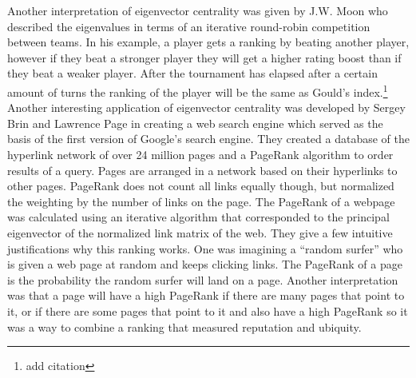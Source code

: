 \documentclass{article}
\theoremstyle{definition}
\theoremstyle{remark}
\begin{document}
Another interpretation of eigenvector centrality was given by J.W. Moon who described the eigenvalues in terms of an iterative round-robin competition between teams.  In his example, a player gets a ranking by beating another player, however if they beat a stronger player they will get a higher rating boost than if they beat a weaker player.  After the tournament has elapsed after a certain amount of turns the ranking of the player will be the same as Gould’s index.\footnote{add citation}\\

Another interesting application of eigenvector centrality was developed by Sergey Brin and Lawrence Page in creating a web search engine which served as the basis of the first version of Google’s search engine.  They created a database of the hyperlink network of over 24 million pages and a PageRank algorithm to order results of a query.  Pages are arranged in a network based on their hyperlinks to other pages.  PageRank does not count all links equally though, but normalized the weighting by the number of links on the page.  The PageRank of a webpage was calculated using an iterative algorithm that corresponded to the principal eigenvector of the normalized link matrix of the web.  They give a few intuitive justifications why this ranking works.  One was imagining a “random surfer” who is given a web page at random and keeps clicking links.  The PageRank of a page is the probability the random surfer will land on a page.  Another interpretation was that a page will have a high PageRank if there are many pages that point to it, or if there are some pages that point to it and also have a high PageRank so it was a way to combine a ranking that measured reputation and ubiquity.\\
\end{document}
